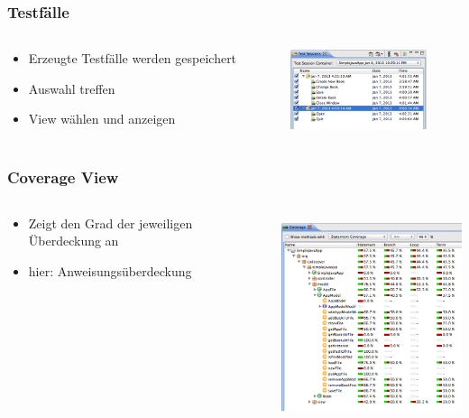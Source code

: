 \documentclass{beamer}
\begin{document}
  \begin{frame}\frametitle{Testfälle}
    \begin{columns}
      \begin{column}{5cm}
        \begin{itemize}
          \item Erzeugte Testfälle werden gespeichert
          \item Auswahl treffen
          \item View wählen und anzeigen
        \end{itemize}
        \vspace{1cm}
      \end{column}
      \begin{column}{5cm}
        \begin{overprint}
          \includegraphics[width=4cm]{pictures/demo_eclipse/02_test_cases.png}
        \end{overprint}
      \end{column}
    \end{columns}
  \end{frame}

  \begin{frame}\frametitle{Coverage View}
    \begin{columns}
      \begin{column}{5cm}
        \begin{itemize}
          \item Zeigt den Grad der jeweiligen Überdeckung an
          \item hier: Anweisungsüberdeckung
        \end{itemize}
        \vspace{2cm}
      \end{column}
      \begin{column}{5cm}
        \begin{overprint}
          \includegraphics[height=6cm]{pictures/demo_eclipse/03_coverage_view.png}
        \end{overprint}
      \end{column}
    \end{columns}
  \end{frame}
\end{document}
